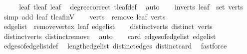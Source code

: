 \begin{isabellebody}
\ \ \isamarkupfalse%
\ \isamarkupfalse%
\ leaf{\isacharcolon}{\kern0pt}\ {\isachardoublequoteopen}t{\isachardot}{\kern0pt}leaf\ leaf{\isachardoublequoteclose}\ \isamarkupfalse%
\ degree{\isacharunderscore}{\kern0pt}correct\ t{\isachardot}{\kern0pt}leaf{\isacharunderscore}{\kern0pt}def\ \isamarkupfalse%
\ auto\isanewline
\ \ \isamarkupfalse%
\ in{\isacharunderscore}{\kern0pt}verts{\isacharcolon}{\kern0pt}\ {\isachardoublequoteopen}leaf\ {\isasymin}\ set\ verts{\isachardoublequoteclose}\ \isamarkupfalse%
\ {\isacharparenleft}{\kern0pt}simp\ add{\isacharcolon}{\kern0pt}\ leaf\ t{\isachardot}{\kern0pt}leaf{\isacharunderscore}{\kern0pt}in{\isacharunderscore}{\kern0pt}V{\isacharparenright}{\kern0pt}\isanewline
\ \ \isamarkupfalse%
\ {\isacharquery}{\kern0pt}verts{\isacharprime}{\kern0pt}\ {\isacharequal}{\kern0pt}\ {\isachardoublequoteopen}remove{}\ leaf\ verts{\isachardoublequoteclose}\isanewline
\ \ \isamarkupfalse%
\ {\isacharquery}{\kern0pt}edge{\isacharunderscore}{\kern0pt}list{\isacharprime}{\kern0pt}\ {\isacharequal}{\kern0pt}\ {\isachardoublequoteopen}remove{\isacharunderscore}{\kern0pt}vertex\ leaf\ edge{\isacharunderscore}{\kern0pt}list{\isachardoublequoteclose}\isanewline
\ \ \isamarkupfalse%
\ distinct{\isacharunderscore}{\kern0pt}verts{\isacharprime}{\kern0pt}{\isacharcolon}{\kern0pt}\ {\isachardoublequoteopen}distinct\ {\isacharquery}{\kern0pt}verts{\isacharprime}{\kern0pt}{\isachardoublequoteclose}\ \isamarkupfalse%
\ distinct{\isacharunderscore}{\kern0pt}verts\ distinct{\isacharunderscore}{\kern0pt}remove{}\ \isamarkupfalse%
\ auto\isanewline
\ \ \isamarkupfalse%
\ {\isachardoublequoteopen}card\ {\isacharparenleft}{\kern0pt}edges{\isacharunderscore}{\kern0pt}of{\isacharunderscore}{\kern0pt}edge{\isacharunderscore}{\kern0pt}list\ edge{\isacharunderscore}{\kern0pt}list{\isacharparenright}{\kern0pt}\ {\isasymge}\ {}{\isachardoublequoteclose}\ \isamarkupfalse%
\ edges{\isacharunderscore}{\kern0pt}of{\isacharunderscore}{\kern0pt}edge{\isacharunderscore}{\kern0pt}list{\isacharunderscore}{\kern0pt}def\ \isamarkupfalse%
\ length{\isacharunderscore}{\kern0pt}edge{\isacharunderscore}{\kern0pt}list\ distinct{\isacharunderscore}{\kern0pt}edges\ distinct{\isacharunderscore}{\kern0pt}card\ \isamarkupfalse%
\ fastforce\isanewline
\ \ \isamarkupfalse%
\ \isamarkupfalse%

\end{isabellebody}

